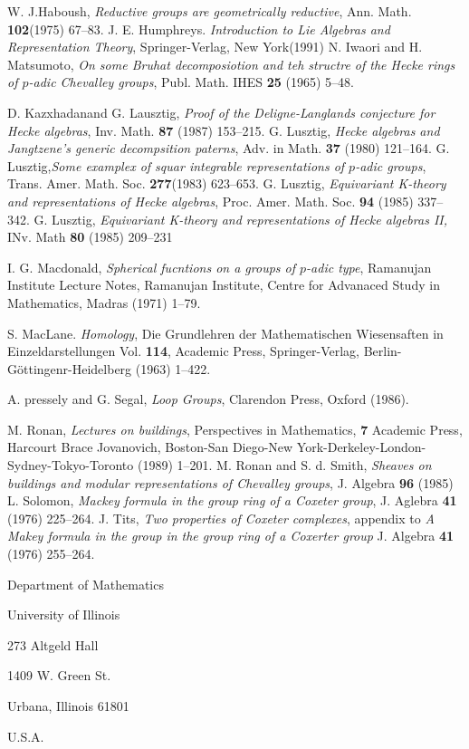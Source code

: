 \begin{thebibliography}{99}
 W. J.Haboush, \textit{Reductive groups are geometrically reductive}, Ann. Math. {\bf 102}(1975) 67--83. 
 J. E. Humphreys. \textit{Introduction to Lie Algebras and Representation Theory}, Springer-Verlag, New York(1991)
 N. Iwaori and H. Matsumoto, \textit{On some Bruhat decomposiotion and teh structre of the Hecke rings of $p$-adic Chevalley groups}, Publ. Math. IHES {\bf 25} (1965) 5--48.

 D. Kazxhadan\pageoriginale and G. Lausztig, \textit{Proof of the Deligne-Langlands conjecture for Hecke algebras}, Inv. Math. {\bf 87} (1987) 153--215.
 G. Lusztig, \textit{Hecke algebras and Jangtzene's generic decompsition paterns}, Adv. in Math. {\bf 37} (1980) 121--164.
 G. Lusztig,\textit{Some examplex of squar integrable representations of $p$-adic groups}, Trans. Amer. Math. Soc. {\bf 277}(1983) 623--653.
 G. Lusztig, \textit{Equivariant K-theory and representations of Hecke algebras}, Proc. Amer. Math. Soc. {\bf 94} (1985) 337--342.
 G. Lusztig, \textit{Equivariant K-theory and representations of Hecke algebras II,} INv. Math
{\bf 80} (1985) 209--231

 I. G. Macdonald, \textit{Spherical fucntions on a groups of $p$-adic type}, Ramanujan Institute Lecture Notes, Ramanujan Institute, Centre for Advanaced Study in Mathematics, Madras (1971) 1--79.

 S. MacLane. \textit{Homology}, Die Grundlehren der Mathematischen Wiesensaften in Einzeldarstellungen Vol. {\bf 114}, Academic Press, Springer-Verlag, Berlin-G\"ottingenr-Heidelberg (1963) 1--422.

 A. pressely and G. Segal, \textit{Loop Groups}, Clarendon Press, Oxford (1986).

 M. Ronan, \textit{Lectures on buildings}, Perspectives in Mathematics, {\bf 7} Academic Press, Harcourt Brace Jovanovich, Boston-San Diego-New York-Derkeley-London-Sydney-Tokyo-Toronto (1989) 1--201.
 M. Ronan and S. d. Smith, \textit{Sheaves on buildings and modular representations of Chevalley groups}, J. Algebra {\bf 96} (1985)
 L. Solomon, \textit{Mackey formula in the group ring of a Coxeter group}, J. Aglebra {\bf 41} (1976) 225--264.
 J. Tits, \textit{Two properties of Coxeter complexes}, appendix to \textit{A Makey formula in the group in the group ring of a Coxerter group} J. Algebra {\bf 41} (1976) 255--264.
\end{thebibliography}

\bigskip

\begin{flushleft}
Department of Mathematics

University of Illinois

273 Altgeld Hall

1409 W. Green St.

Urbana, Illinois 61801

U.S.A.
\end{flushleft}

